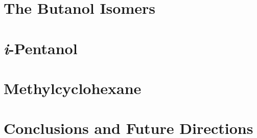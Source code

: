 \documentclass[12pt, letterpaper, oneside, draft]{book}
\begin{document}
\chapter{The Butanol Isomers}
\label{chap:buoh}

\cleardoublepage

\chapter{\textit{i}-Pentanol}
\label{chap:peoh}

\cleardoublepage

\chapter{Methylcyclohexane}
\label{chap:mch}

\cleardoublepage

\chapter{Conclusions and Future Directions}
\label{chap:conclusions}

\cleardoublepage

\printbibliography[heading=bibintoc]
\end{document}
